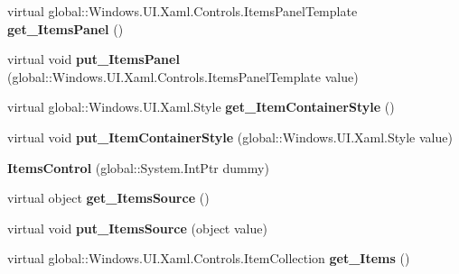 \begin{DoxyCompactItemize}
virtual global\+::\+Windows.\+U\+I.\+Xaml.\+Controls.\+Items\+Panel\+Template {\bfseries get\+\_\+\+Items\+Panel} ()
\item 
\mbox{\label{class_windows_1_1_u_i_1_1_xaml_1_1_controls_1_1_items_control_affd7b155eec7e46ac2c935a6634d6d21}} 
virtual void {\bfseries put\+\_\+\+Items\+Panel} (global\+::\+Windows.\+U\+I.\+Xaml.\+Controls.\+Items\+Panel\+Template value)
\item 
\mbox{\label{class_windows_1_1_u_i_1_1_xaml_1_1_controls_1_1_items_control_ac8ecf557d2e90d25785dc40f5d1e3069}} 
virtual global\+::\+Windows.\+U\+I.\+Xaml.\+Style {\bfseries get\+\_\+\+Item\+Container\+Style} ()
\item 
\mbox{\label{class_windows_1_1_u_i_1_1_xaml_1_1_controls_1_1_items_control_a22e6b11c11e2306e3c13c1294b698d47}} 
virtual void {\bfseries put\+\_\+\+Item\+Container\+Style} (global\+::\+Windows.\+U\+I.\+Xaml.\+Style value)
\item 
\mbox{\label{class_windows_1_1_u_i_1_1_xaml_1_1_controls_1_1_items_control_a2a23be568a479e115892800d6b88b77a}} 
{\bfseries Items\+Control} (global\+::\+System.\+Int\+Ptr dummy)
\item 
\mbox{\label{class_windows_1_1_u_i_1_1_xaml_1_1_controls_1_1_items_control_ada6978b5b6da9e42647e7bbae2efa4d9}} 
virtual object {\bfseries get\+\_\+\+Items\+Source} ()
\item 
\mbox{\label{class_windows_1_1_u_i_1_1_xaml_1_1_controls_1_1_items_control_aeea26f9c774f2e66be28cffd70420e8c}} 
virtual void {\bfseries put\+\_\+\+Items\+Source} (object value)
\item 
\mbox{\label{class_windows_1_1_u_i_1_1_xaml_1_1_controls_1_1_items_control_a5f5a8f9fc3aafc90d6f7e7ad33f58698}} 
virtual global\+::\+Windows.\+U\+I.\+Xaml.\+Controls.\+Item\+Collection {\bfseries get\+\_\+\+Items} ()

\end{DoxyCompactItemize}
